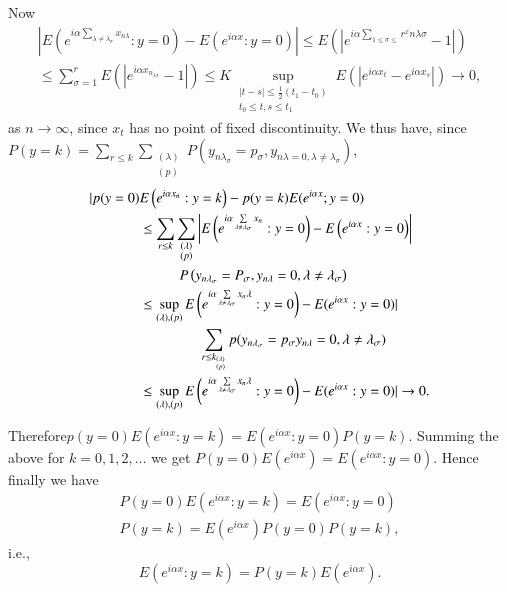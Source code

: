 Now
\begin{gather*}
|E \left(e^{i \alpha \sum\limits_{\lambda \neq
    \lambda_\sigma}x_{n\lambda}}
:y=0\right)-E\left(e^{i \alpha x}: y=0\right)|\leq
  E\left(|e^{i \alpha \sum\limits_{1 \leq \sigma \leq}r^xn \lambda \sigma}-1|\right)\\ 
  \leq \sum_{\sigma=1}^r E \left(|e^{i \alpha x_{n_{\lambda
        \sigma}}}-1|\right)\leq K \sup_{\substack{|t-s|\leq
      \frac{1}{2}(t_1-t_0)\\{t_0 \leq t,s \leq t_1}}} E \left(|e^{i \alpha
    x_t}-e^{i \alpha x_s}|\right) \to 0, 
\end{gather*}
as $n \to \infty$, since $x_t$ has no point of fixed discontinuity. We
thus have, since $P(y=k)=\sum\limits_{r \leq
  k}\sum\limits_{\substack{(\lambda)\\{(p)}}}
P(y_{n \lambda _ \sigma}=p_ \sigma,y_{n \lambda=0 ,\lambda \neq
  \lambda_ \sigma})$, 
\begin{align*}
  |p(y=0) & E \left(e^{i \alpha x_n}:y=k\right)-p(y=k)E(e^{i \alpha x};y=0)\\
  &\leq \sum _{r \leq k}\sum_{\substack{(\lambda)\\(p)}}\left|E
  \left(e^{i \alpha \sum 
    \limits_{\lambda \neq \lambda_ \sigma}x_n}:y=0\right)-E \left(e^{i \alpha
    x}:y=0\right)\right|\\
  & \hspace{1cm}P \left(y_{n \lambda_ \sigma}=P_ \sigma,y_{n \lambda}=0, \lambda
  \neq \lambda_ \sigma\right)\\ 
  &\leq \sup_{(\lambda),(p)}E\left(e^{i \alpha \sum \limits_{\lambda \neq
      \lambda_ \sigma}x_n \lambda}:y=0\right)-E (e^{i \alpha
    x}:y=0)|\\
  & \hspace{1.5cm}\sum _{r
    \leq k_{^{(\lambda)}_{(p)}}} p(y_{n \lambda_{\sigma}}= p_{\sigma}y_{n\lambda}=0, \lambda \neq
    \lambda_\sigma)\\ 
  &\leq \sup_{(\lambda),(p)}E \left(e^{i \alpha \sum \limits_{\lambda \neq
      \lambda_ \sigma}x_n \lambda}:y=0\right)-E(e^{i \alpha x}:y=0)| \to 0. 
\end{align*}

Therefore\pageoriginale $p(y=0) E (e^{i \alpha x}:  y=k)  = E(e^{i
  \alpha x}: y = 0) 
P(y= k)$. Summing the above for $k= 0, 1, 2, \ldots$ we get $P (y=0) E
(e^{i \alpha x}) = E(e^{i \alpha x}: y = 0)$. Hence finally we have  
\begin{gather*}
P(y=0) E(e^{i \alpha x}: y = k)= E(e^{i \alpha x}: y = 0)\\
P(y=k) = E(e^{i \alpha x})P( y = 0) P (y=k), 
\end{gather*}
i.e.,
$$
E(e^{i \alpha x}: y = k) = P (y=k) E(e^{i \alpha
    x}).
$$

